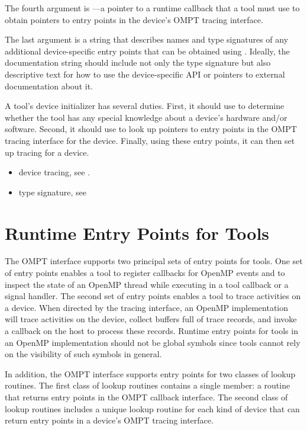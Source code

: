 The fourth argument is ---a pointer to a runtime callback
that a tool must use to obtain pointers to entry points in the
device's OMPT tracing interface.

The last argument is a string that describes names and type signatures
of any additional device-specific entry points that can be obtained
using . Ideally, the documentation string should include
not only the type signature but also descriptive text for how to use
the device-specific API or pointers to external documentation about
it.

\effect

A tool's device initializer has several duties.  First, it should use
 to determine whether the tool has any special knowledge
about a device's hardware and/or software.  Second, it should use
 to look up pointers to entry points in the OMPT tracing
interface for the device.  Finally, using these entry points, it can
then set up tracing for a device.

\crossreferences
\begin{itemize}
\item device tracing, see
. 
\item {} type signature, see 
\end{itemize}

\section{Runtime Entry Points for Tools}

The OMPT interface supports two principal sets of entry points for tools. One
set of entry points enables a tool to register callbacks for OpenMP
events and to inspect the state of an OpenMP thread while
executing in a tool callback or a signal handler. The second set of entry points enables a
tool to trace activities on a device. When directed by the tracing
interface, an OpenMP implementation will trace activities on the device, collect
buffers full of trace records, and invoke a callback on the host to
process these records. 
Runtime entry points for tools in an OpenMP implementation
should not be global symbols since tools cannot rely on the visibility
of such symbols in general.

In addition, the OMPT interface supports
entry points for two classes of lookup routines. The first
class of lookup routines contains a single member: a
routine that returns entry points in the OMPT callback interface. 
The second class of lookup routines includes 
a unique lookup routine for each kind of
device that can return entry points in a device's OMPT tracing interface.

